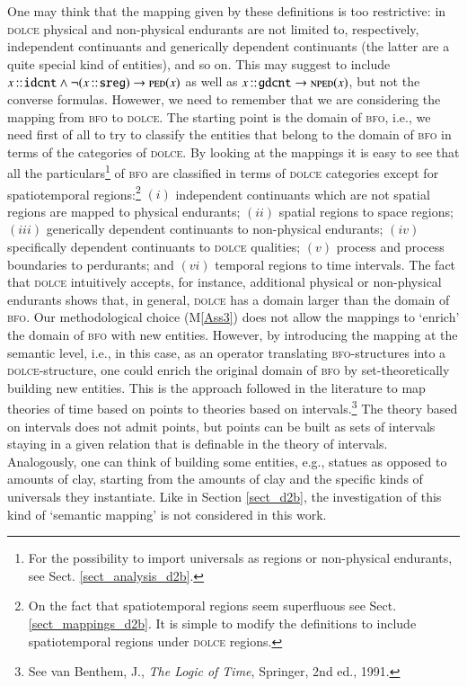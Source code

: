 \documentclass[ao]{iosart2x}
\newcommand{\nb}[1]{\textcolor{red}{$|$}\marginpar{\hspace*{-0cm}\parbox{20mm}{\scriptsize\raggedright\textcolor{red}{#1}}}}
\newcommand{\cn}[1]{\mathtt{#1}}
\newcommand{\dolce}{{\textsc{dolce}}}
\newcommand{\bfo}{{\textsc{bfo}}}
\newcommand {\NPEDdcat} {\textsc{nped}}
\newcommand {\PEDdcat} {\textsc{ped}}
\newcommand{\idcntbcat}{\cn{idcnt}}
\newcommand{\gdcntbcat}{\cn{gdcnt}}
\newcommand{\sregbcat}{\cn{sreg}}
\newcommand{\bfoiof}[1]{{\,::_{#1\:\!}}}
\begin{document}
One may think that the mapping given by these definitions is too restrictive: in {\dolce} physical and non-physical endurants are not limited to, respectively, independent continuants and generically dependent continuants (the latter are a quite special kind of entities), and so on. This may suggest to include  $x \bfoiof{} \idcntbcat \land \neg(x \bfoiof{} \sregbcat) \to \PEDdcat(x)$ as well as $x \bfoiof{} \gdcntbcat \to \NPEDdcat(x)$, but not the converse formulas. Howewer, we need to remember that we are considering the mapping from {\bfo} to {\dolce}. The starting point is the domain of {\bfo}, i.e., we need first of all to try to classify the entities that belong to the domain of {\bfo} in terms of the categories of {\dolce}. 
By looking at the mappings it is easy to see that all the particulars\footnote{For the possibility to import universals as regions or non-physical endurants, see Sect. \ref{sect_analysis_d2b}.} of {\bfo} are classified in terms of {\dolce} categories except for spatiotemporal regions:\footnote{On the fact that spatiotemporal regions seem superfluous see Sect. \ref{sect_mappings_d2b}. It is simple to modify the definitions to include spatiotemporal regions under {\dolce} regions.} $(i)$ independent continuants which are not spatial regions are mapped to physical endurants; $(ii)$ spatial regions to space regions; $(iii)$ generically dependent continuants to non-physical endurants; $(iv)$ specifically dependent continuants to {\dolce} qualities; $(v)$ process and process boundaries to perdurants; and $(vi)$ temporal regions to time intervals. The fact that {\dolce} intuitively accepts, for instance, additional physical or non-physical endurants shows that, in general, {\dolce} has a domain larger than the domain of {\bfo}. Our methodological choice (M\ref{Ass3}) does not allow the mappings to `enrich' the domain of {\bfo} with new entities.%
However, by introducing the mapping at the semantic level, i.e., in this case, as an operator translating {\bfo}-structures into a {\dolce}-structure, one could enrich the original domain of {\bfo} by set-theoretically building new entities. This is the approach followed in the literature to map theories of time based on points to theories based on intervals.\footnote{See van Benthem, J., \emph{The Logic of Time}, Springer, 2nd ed., 1991.} %
The theory based on intervals does not admit points, but points can be built as sets of intervals staying in a given relation that is definable in the theory of intervals.  Analogously, one can think of building some entities, e.g., statues as opposed to amounts of clay, starting from the amounts of clay and the specific kinds of universals they instantiate. Like in Section \ref{sect_d2b}, the investigation of this kind of `semantic mapping' is not considered in this work.%
\end{document}

